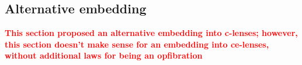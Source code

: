 \documentclass[a4paper,10pt]{article}
\newcommand{\finish}[1]{#1}
\newcommand{\comment}[1]{\finish{\textbf{\textcolor{red}{#1}}}}
\begin{document}
\subsection{Alternative embedding}
  \comment{This section proposed an alternative embedding into c-lenses; however, this section doesn't make sense for an embedding into ce-lenses, without additional laws for being an opfibration}
%   
%   
% 
%   
%   
\end{document}
